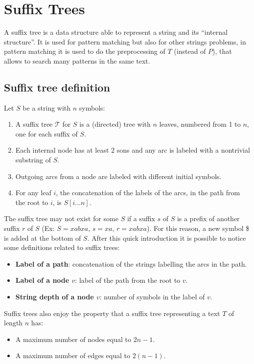 \newpage

\section{Suffix Trees}
A suffix tree is a data structure able to represent a string and its “internal structure”. It is used for pattern matching but also for other strings problems, in pattern matching it is used to do the preprocessing of $T$ (instead of $P$), that allows to search many patterns in the same text.

\subsection{Suffix tree definition} 
Let $S$ be a string with $n$ symbols:
\begin{enumerate}
	\item A suffix tree $\mathcal{T}$ for $S$ is a (directed) tree with $n$ leaves, numbered from 1
	to $n$, one for each suffix of $S$.
	\item Each internal node has at least $2$ sons and any arc is labeled with a 
	nontrivial substring of $S$.
	\item Outgoing arcs from a node are labeled with different initial symbols.
	\item For any leaf $i$, the concatenation of the labels of the arcs, in the path from the root to $i$, is $S[i \dots n]$.
\end{enumerate}
The suffix tree may not exist for some $S$ if a suffix $s$ of $S$ is a prefix of another suffix $r$ of $S$ (Ex: $S = xabxa$, $s=xa$, $r=xabxa$). For this reason, a new symbol \$ is added at the bottom of $S$.
\newpage
After this quick introduction it is possible to notice some definitions related to suffix trees:
\begin{itemize}
	\item \textbf{Label of a path}: concatenation of the strings labelling the arcs in the path.
	\item \textbf{Label of a node $v$}: label of the path from the root to $v$.
	\item \textbf{String depth of a node $v$}: number of symbols in the label of $v$. 
\end{itemize}
Suffix trees also enjoy the property that a suffix tree representing a text $T$ of length $n$ has:
\begin{itemize}
	\item A maximum number of nodes equal to $2n - 1$.
	\item A maximum number of edges equal to $2(n-1)$.
\end{itemize}
